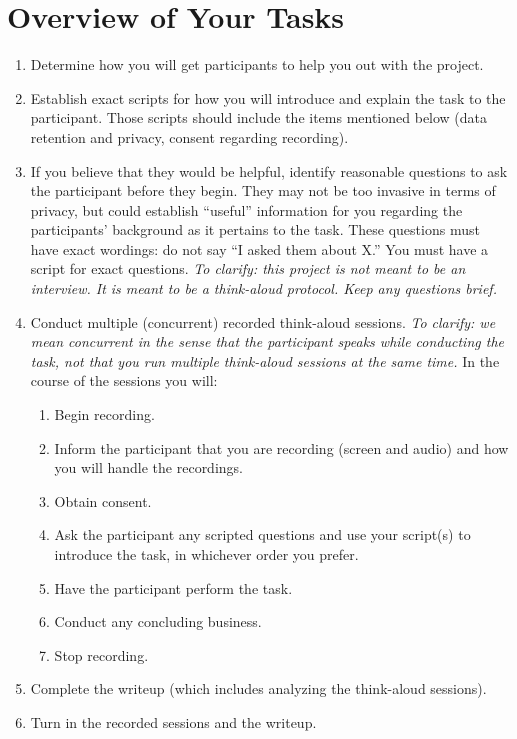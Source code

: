\documentclass{article}
\begin{document}
\section{Overview of Your Tasks}
\begin{enumerate}
    \item Determine how you will get participants to help you out with the project.
    
    \item Establish exact scripts for how you will introduce and explain the task to the participant. Those scripts should include the items mentioned below (data retention and privacy, consent regarding recording).
    
    \item If you believe that they would be helpful, identify reasonable questions to ask the participant before they begin. They may not be too invasive in terms of privacy, but could establish ``useful'' information for you regarding the participants' background as it pertains to the task. These questions must have exact wordings: do not say ``I asked them about X.'' You must have a script for exact questions. \textit{To clarify: this project is not meant to be an interview. It is meant to be a think-aloud protocol. Keep any questions brief.}
    
    \item Conduct multiple (concurrent) recorded think-aloud sessions. \textit{To clarify: we mean concurrent in the sense that the participant speaks while conducting the task, not that you run multiple think-aloud sessions at the same time. }In the course of the sessions you will:
    \begin{enumerate}
        \item Begin recording.
        \item Inform the participant that you are recording (screen and audio) and how you will handle the recordings.  
        \item Obtain consent.
        \item Ask the participant any scripted questions and use your script(s) to introduce the task, in whichever order you prefer.
        \item Have the participant perform the task.
        \item Conduct any concluding business.
        \item Stop recording.
    \end{enumerate}

    \item Complete the writeup (which includes analyzing the think-aloud sessions). 
    
    \item Turn in the recorded sessions and the writeup.

\end{enumerate}
\end{document}
